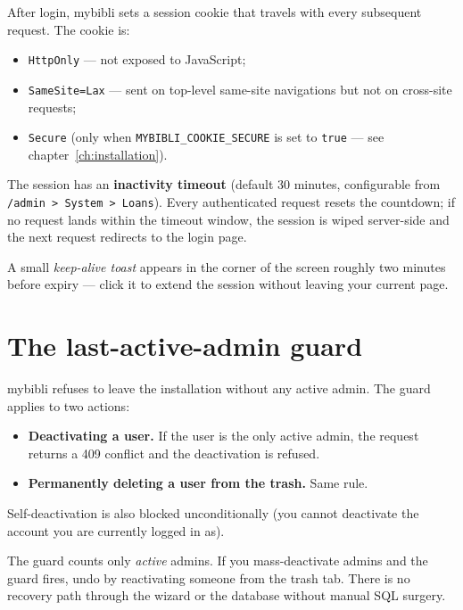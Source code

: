 After login, mybibli sets a session cookie
that travels with every subsequent request. The cookie is:

\begin{itemize}
  \item \texttt{HttpOnly} — not exposed to JavaScript;
  \item \texttt{SameSite=Lax} — sent on top-level same-site
        navigations but not on cross-site requests;
  \item \texttt{Secure} (only when \texttt{MYBIBLI\_COOKIE\_SECURE}
        is set to \texttt{true} — see chapter~\ref{ch:installation}).
\end{itemize}

The session has an \textbf{inactivity timeout} (default 30 minutes, configurable from
\texttt{/admin > System > Loans}). Every authenticated request resets
the countdown; if no request lands within the timeout window, the
session is wiped server-side and the next request redirects to the
login page.

A small \emph{keep-alive toast} appears in the corner of the screen
roughly two minutes before expiry — click it to extend the session
without leaving your current page.

\section{The last-active-admin guard}

mybibli refuses to leave the installation without any active admin.
The guard applies to two actions:

\begin{itemize}
  \item \textbf{Deactivating a user.} If the user is the only
        active admin, the request returns a 409 conflict and the
        deactivation is refused.
  \item \textbf{Permanently deleting a user from the trash.} Same
        rule.
\end{itemize}

Self-deactivation is also blocked unconditionally (you cannot
deactivate the account you are currently logged in as).

\begin{warning}
The guard counts only \emph{active} admins. If you mass-deactivate
admins and the guard fires, undo by reactivating someone from the
trash tab. There is no recovery path through the wizard or the
database without manual SQL surgery.
\end{warning}

